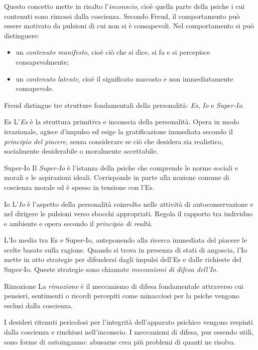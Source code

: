 \documentclass[a4paper]{article}
\begin{document}
Questo concetto mette in risalto l'\emph{inconscio}, cioè quella parte della psiche i cui contenuti sono rimossi dalla coscienza. Secondo Freud, il comportamento può essere motivato da pulsioni di cui non si è consapevoli.
Nel comportamento si può distinguere:
\begin{itemize}
    \item un \emph{contenuto manifesto}, cioè ciò che si dice, si fa e si percepisce consapevolmente;
    \item un \emph{contenuto latente}, cioè il significato nascosto e non immediatamente consapevole.
\end{itemize}
Freud distingue tre strutture fondamentali della personalità: \emph{Es}, \emph{Io} e \emph{Super-Io}.
\begin{snippetdefinition}{Es}
    L'\emph{Es} è la struttura primitiva e inconscia della personalità. Opera in modo irrazionale, agisce d'impulso ed esige la gratificazione immediata secondo il \emph{principio del piacere}, senza considerare se ciò che desidera sia realistico, socialmente desiderabile o moralmente accettabile.
\end{snippetdefinition}
\begin{snippetdefinition}{Super-Io}
    Il \emph{Super-Io} è l'istanza della psiche che comprende le norme sociali e morali e le aspirazioni ideali. Corrisponde in parte alla nozione comune di coscienza morale ed è spesso in tensione con l'Es.
\end{snippetdefinition}
\begin{snippetdefinition}{Io}
    L'\emph{Io} è l'aspetto della personalità coinvolto nelle attività di autoconservazione e nel dirigere le pulsioni verso sbocchi appropriati. Regola il rapporto tra individuo e ambiente e opera secondo il \emph{principio di realtà}.
\end{snippetdefinition}
L'Io media tra Es e Super-Io, anteponendo alla ricerca immediata del piacere le scelte basate sulla ragione.
Quando si trova in presenza di stati di angoscia, l'Io mette in atto strategie per difendersi dagli impulsi dell'Es e dalle richieste del Super-Io. Queste strategie sono chiamate \emph{meccanismi di difesa dell'Io}.
\begin{snippetdefinition}{Rimozione}
    La \emph{rimozione} è il meccanismo di difesa fondamentale attraverso cui pensieri, sentimenti o ricordi percepiti come minacciosi per la psiche vengono esclusi dalla coscienza.
\end{snippetdefinition}
I desideri ritenuti pericolosi per l'integrità dell'apparato psichico vengono respinti dalla coscienza e rinchiusi nell'inconscio. I meccanismi di difesa, pur essendo utili, sono forme di autoinganno: abusarne crea più problemi di quanti ne risolva.
\end{document}
